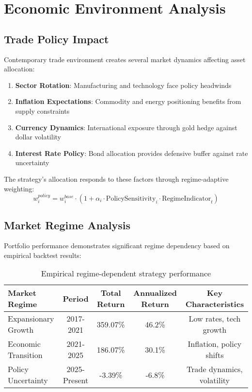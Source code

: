 \documentclass[onecolumn,11pt]{IEEEtran}
\begin{document}
\section{Economic Environment Analysis}

\subsection{Trade Policy Impact}

Contemporary trade environment creates several market dynamics affecting asset allocation:

\begin{enumerate}
    \item \textbf{Sector Rotation}: Manufacturing and technology face policy headwinds
    \item \textbf{Inflation Expectations}: Commodity and energy positioning benefits from supply constraints
    \item \textbf{Currency Dynamics}: International exposure through gold hedge against dollar volatility
    \item \textbf{Interest Rate Policy}: Bond allocation provides defensive buffer against rate uncertainty
\end{enumerate}

The strategy's allocation responds to these factors through regime-adaptive weighting:
\begin{equation}
w_i^{policy} = w_i^{base} \cdot (1 + \alpha_i \cdot \text{PolicySensitivity}_i \cdot \text{RegimeIndicator}_t)
\end{equation}

\subsection{Market Regime Analysis}

Portfolio performance demonstrates significant regime dependency based on empirical backtest results:

\begin{table}[h]
\centering
\begin{tabular}{lcccc}
\toprule
Market Regime & Period & Total Return & Annualized Return & Key Characteristics \\
\midrule
Expansionary Growth & 2017-2021 & 359.07\% & 46.2\% & Low rates, tech growth \\
Economic Transition & 2021-2025 & 186.07\% & 30.1\% & Inflation, policy shifts \\
Policy Uncertainty & 2025-Present & -3.39\% & -6.8\% & Trade dynamics, volatility \\
\bottomrule
\end{tabular}
\caption{Empirical regime-dependent strategy performance}
\end{table}
\end{document}
